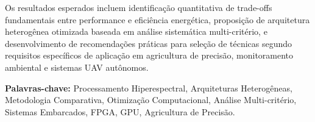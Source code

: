 Os resultados esperados incluem identificação quantitativa de trade-offs fundamentais entre performance e eficiência energética, proposição de arquitetura heterogênea otimizada baseada em análise sistemática multi-critério, e desenvolvimento de recomendações práticas para seleção de técnicas segundo requisitos específicos de aplicação em agricultura de precisão, monitoramento ambiental e sistemas UAV autônomos.

\textbf{Palavras-chave:} 
Processamento Hiperespectral, Arquiteturas Heterogêneas, Metodologia Comparativa, Otimização Computacional, Análise Multi-critério, Sistemas Embarcados, FPGA, GPU, Agricultura de Precisão.
